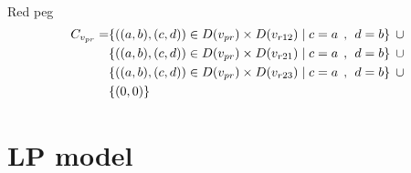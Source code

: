 \\ Red peg 
\begin{align*}
C_{v_{pr}} = &\{((a,b),(c,d))\in D(v_{pr}) \times D(v_{r12})\mid c = a \hspace{1ex} , \hspace{1ex}  d = b\} \hspace{1ex} \cup 
\\&\{((a,b),(c,d))\in D(v_{pr}) \times D(v_{r21})\mid c = a \hspace{1ex} , \hspace{1ex}  d = b\} \hspace{1ex} \cup 
\\&\{ ((a,b),(c,d))\in D(v_{pr}) \times D(v_{r23})\mid c = a \hspace{1ex} , \hspace{1ex}  d = b\}\hspace{1ex} \cup 
\\& \{(0,0)\}
\end{align*}
\section{LP model}
\label{sec:LP model}
